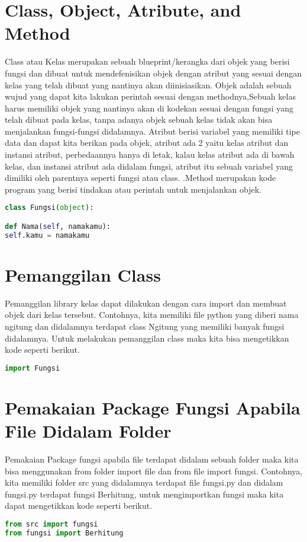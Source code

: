 \section{Class, Object, Atribute, and Method}
Class atau Kelas merupakan sebuah blueprint/kerangka dari objek yang berisi fungsi dan dibuat untuk mendefenisikan objek dengan atribut yang sesuai dengan kelas yang telah dibuat yang nantinya akan diinisiasikan. Objek adalah sebuah wujud yang dapat kita lakukan perintah sesuai dengan methodnya,Sebuah kelas harus memiliki objek yang nantinya akan di kodekan sesuai dengan fungsi yang telah dibuat pada kelas, tanpa adanya objek sebuah kelas tidak akan bisa menjalankan fungsi-fungsi didalamnya. Atribut berisi variabel yang memiliki tipe data dan dapat kita berikan pada objek, atribut ada 2 yaitu kelas atribut dan instansi atribut, perbedaannya hanya di letak, kalau kelas atribut ada di bawah kelas, dan instansi atribut ada didalam fungsi, atribut itu sebuah variabel yang dimiliki oleh parentnya seperti fungsi atau class. .Method merupakan kode program yang berisi tindakan atau perintah untuk menjalankan objek.
\begin{lstlisting}[language=Python]
class Fungsi(object): 

def Nama(self, namakamu):
self.kamu = namakamu
\end{lstlisting}

\section{Pemanggilan Class}
Pemanggilan library kelas dapat dilakukan dengan cara import dan membuat objek dari kelas tersebut. Contohnya, kita memiliki ﬁle python yang diberi nama ngitung dan didalamnya terdapat class Ngitung yang memiliki banyak fungsi didalamnya. Untuk melakukan pemanggilan class maka kita bisa mengetikkan kode seperti berikut.
\begin{lstlisting}[language=Python]
import Fungsi
\end{lstlisting}

\section{Pemakaian Package Fungsi Apabila File Didalam Folder}
Pemakaian Package fungsi apabila ﬁle terdapat didalam sebuah folder maka kita bisa menggunakan from folder import ﬁle dan from ﬁle import fungsi. Contohnya, kita memiliki folder src yang didalamnya terdapat ﬁle fungsi.py dan didalam fungsi.py terdapat fungsi Berhitung, untuk mengimportkan fungsi maka kita dapat mengetikkan kode seperti berikut.
\begin{lstlisting}[language=Python]
from src import fungsi 
from fungsi import Berhitung
\end{lstlisting}

